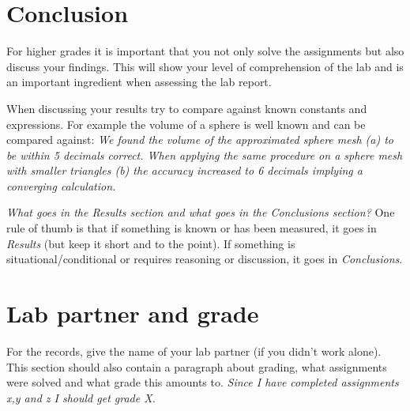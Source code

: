 \documentclass[onecolumn]{article}
\begin{document}


\section{Conclusion}
For higher grades it is important that you not only solve the assignments but also discuss your findings. This will show your level of comprehension of the lab and is an important ingredient when assessing  the lab report.

When discussing your results try to compare against known constants and expressions. For example the volume of a sphere is well known and can be compared against: \emph{We found the volume of the approximated sphere mesh (a) to be within 5 decimals correct. When applying the same procedure on a sphere mesh with smaller triangles (b) the accuracy increased to 6 decimals implying a converging calculation.}

\emph{What goes in the Results section and what goes in the Conclusions section?} One rule of thumb is that if something is known or has been measured, it goes in \emph{Results} (but keep it short and to the point). If something is situational/conditional or requires reasoning or discussion, it goes in \emph{Conclusions}.


\section{Lab partner and grade}
For the records, give the name of your lab partner (if you didn't work alone). This section should also contain a paragraph about grading, what assignments were solved and what grade this amounts to. \emph{Since I have completed assignments x,y and z I should get grade X.}

\nocite{*}


\end{document}
